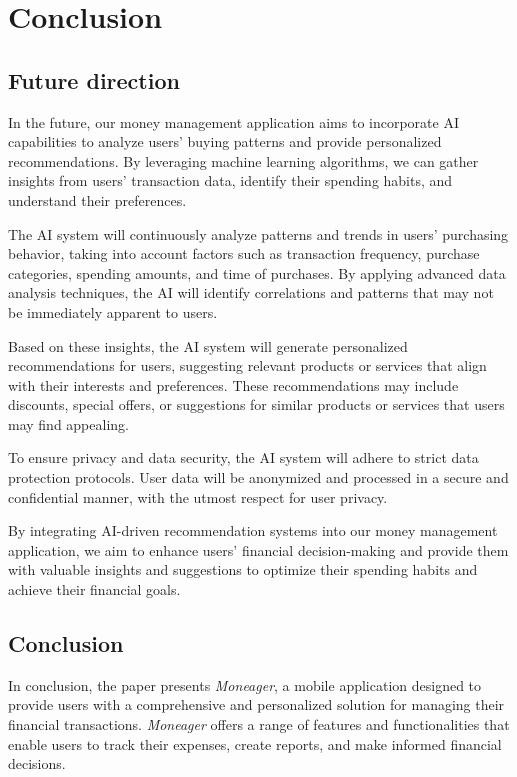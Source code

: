 \newpage
\chapter{Conclusion}
    \section{Future direction}
In the future, our money management application aims to incorporate AI capabilities to analyze users' buying patterns and provide personalized recommendations. By leveraging machine learning algorithms, we can gather insights from users' transaction data, identify their spending habits, and understand their preferences.

The AI system will continuously analyze patterns and trends in users' purchasing behavior, taking into account factors such as transaction frequency, purchase categories, spending amounts, and time of purchases. By applying advanced data analysis techniques, the AI will identify correlations and patterns that may not be immediately apparent to users.

Based on these insights, the AI system will generate personalized recommendations for users, suggesting relevant products or services that align with their interests and preferences. These recommendations may include discounts, special offers, or suggestions for similar products or services that users may find appealing.

To ensure privacy and data security, the AI system will adhere to strict data protection protocols. User data will be anonymized and processed in a secure and confidential manner, with the utmost respect for user privacy.

By integrating AI-driven recommendation systems into our money management application, we aim to enhance users' financial decision-making and provide them with valuable insights and suggestions to optimize their spending habits and achieve their financial goals.

\section{Conclusion}
In conclusion, the paper presents \textit{Moneager}, a mobile application designed to provide users with a comprehensive and personalized solution for managing their financial transactions. \textit{Moneager} offers a range of features and functionalities that enable users to track their expenses, create reports, and make informed financial decisions.

